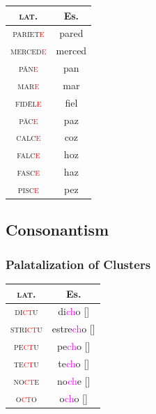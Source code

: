 \documentclass{report}[12pt]
\begin{document}
\begin{tabular}{c c}
  \textsc{lat.} & Es. \\
  \hline
  \textsc{pariet\textcolor{red}{e}} & pared \\
  \textsc{merced\textcolor{red}{e}} & merced \\
  \textsc{p\={a}n\textcolor{red}{e}} & pan \\
  \textsc{mar\textcolor{red}{e}} & mar \\
  \textsc{fid\={e}l\textcolor{red}{e}} & fiel \\
  \textsc{p\={a}c\textcolor{red}{e}} & paz \\
  \textsc{calc\textcolor{red}{e}} & coz \\
  \textsc{falc\textcolor{red}{e}} & hoz \\
  \textsc{fasc\textcolor{red}{e}} & haz \\
  \textsc{pisc\textcolor{red}{e}} & pez \\
\end{tabular}

\subsection{Consonantism}

\subsubsection*{Palatalization of Clusters}

\begin{tcolorbox}

\end{tcolorbox}

\begin{tabular}{c c}
  \textsc{lat.} & Es. \\
  \hline
  \textsc{di\textcolor{red}{ct}u} & di\textcolor{magenta}{ch}o [\textipa{\textteshlig}] \\
  \textsc{stri\textcolor{red}{ct}u} & estre\textcolor{magenta}{ch}o [\textipa{\textteshlig}] \\
  \textsc{pe\textcolor{red}{ct}u} & pe\textcolor{magenta}{ch}o [\textipa{\textteshlig}] \\
  \textsc{te\textcolor{red}{ct}u} & te\textcolor{magenta}{ch}o [\textipa{\textteshlig}] \\
  \textsc{no\textcolor{red}{ct}e} & no\textcolor{magenta}{ch}e [\textipa{\textteshlig}] \\
  \textsc{o\textcolor{red}{ct}o} & o\textcolor{magenta}{ch}o [\textipa{\textteshlig}] \\
\end{tabular}
\end{document}
